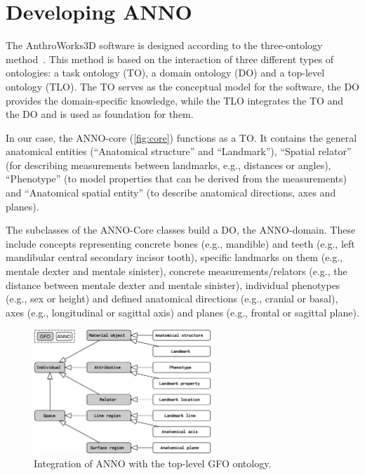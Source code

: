 \documentclass[sw]{iosart2x}
\newcommand{\aw}{AnthroWorks3D}
\begin{document}
\section{Developing ANNO}
The \aw{} software is designed according to the three-ontology method~\citep{threeontologymethod}.
This method is based on the interaction of three different types of ontologies: a task ontology (TO), a domain ontology (DO) and a top-level ontology (TLO).
The TO serves as the conceptual model for the software, the DO provides the domain-specific knowledge, while the TLO integrates the TO and the DO and is used as foundation for them.

In our case, the ANNO-core (\cref{fig:core}) functions as a TO.
It contains the general anatomical entities (\enquote{Anatomical structure} and \enquote{Landmark}),
\enquote{Spatial relator} (for describing measurements between landmarks, e.g., distances or angles),
\enquote{Phenotype} (to model properties that can be derived from the measurements) and \enquote{Anatomical spatial entity} (to describe anatomical directions, axes and planes).

The subclasses of the ANNO-Core classes build a DO, the ANNO-domain.
These include concepts representing concrete bones (e.g., mandible) and teeth (e.g., left mandibular central secondary incisor tooth),
specific landmarks on them (e.g., mentale dexter and mentale sinister),
concrete measurements/relators (e.g., the distance between mentale dexter and mentale sinister),
individual phenotypes (e.g., sex or height) and defined anatomical directions (e.g., cranial or basal),
axes (e.g., longitudinal or sagittal axis) and planes (e.g., frontal or sagittal plane).

\begin{figure}[h]
\includegraphics[width=0.6\textwidth]{img/gfo.pdf}
\caption{Integration of ANNO with the top-level GFO ontology.}\label{fig:gfo}
\end{figure}
\end{document}
